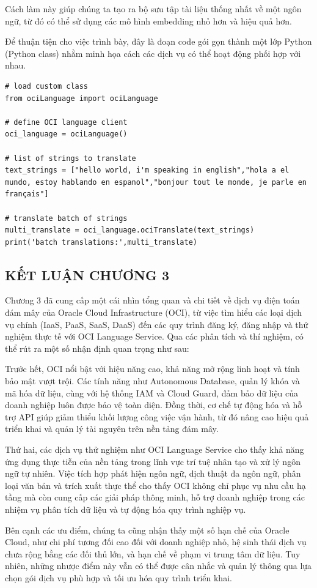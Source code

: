 Cách làm này giúp chúng ta tạo ra bộ sưu tập tài liệu thống nhất về một ngôn ngữ, từ đó có thể sử dụng các mô hình embedding nhỏ hơn và hiệu quả hơn.

Để thuận tiện cho việc trình bày, đây là đoạn code gói gọn thành một lớp Python (Python class) nhằm minh họa cách các dịch vụ có thể hoạt động phối hợp với nhau.

\begin{lstlisting}
# load custom class
from ociLanguage import ociLanguage

# define OCI language client
oci_language = ociLanguage()

# list of strings to translate
text_strings = ["hello world, i'm speaking in english","hola a el mundo, estoy hablando en espanol","bonjour tout le monde, je parle en français"]

# translate batch of strings
multi_translate = oci_language.ociTranslate(text_strings)
print('batch translations:',multi_translate)

\end{lstlisting}

\newpage
\subsection*{\centering KẾT LUẬN CHƯƠNG 3}

Chương 3 đã cung cấp một cái nhìn tổng quan và chi tiết về dịch vụ điện toán đám mây của Oracle Cloud Infrastructure (OCI), từ việc tìm hiểu các loại dịch vụ chính (IaaS, PaaS, SaaS, DaaS) đến các quy trình đăng ký, đăng nhập và thử nghiệm thực tế với OCI Language Service. Qua các phân tích và thí nghiệm, có thể rút ra một số nhận định quan trọng như sau:

Trước hết, OCI nổi bật với hiệu năng cao, khả năng mở rộng linh hoạt và tính bảo mật vượt trội. Các tính năng như Autonomous Database, quản lý khóa và mã hóa dữ liệu, cùng với hệ thống IAM và Cloud Guard, đảm bảo dữ liệu của doanh nghiệp luôn được bảo vệ toàn diện. Đồng thời, cơ chế tự động hóa và hỗ trợ API giúp giảm thiểu khối lượng công việc vận hành, từ đó nâng cao hiệu quả triển khai và quản lý tài nguyên trên nền tảng đám mây.

Thứ hai, các dịch vụ thử nghiệm như OCI Language Service cho thấy khả năng ứng dụng thực tiễn của nền tảng trong lĩnh vực trí tuệ nhân tạo và xử lý ngôn ngữ tự nhiên. Việc tích hợp phát hiện ngôn ngữ, dịch thuật đa ngôn ngữ, phân loại văn bản và trích xuất thực thể cho thấy OCI không chỉ phục vụ nhu cầu hạ tầng mà còn cung cấp các giải pháp thông minh, hỗ trợ doanh nghiệp trong các nhiệm vụ phân tích dữ liệu và tự động hóa quy trình nghiệp vụ.

Bên cạnh các ưu điểm, chúng ta cũng nhận thấy một số hạn chế của Oracle Cloud, như chi phí tương đối cao đối với doanh nghiệp nhỏ, hệ sinh thái dịch vụ chưa rộng bằng các đối thủ lớn, và hạn chế về phạm vi trung tâm dữ liệu. Tuy nhiên, những nhược điểm này vẫn có thể được cân nhắc và quản lý thông qua lựa chọn gói dịch vụ phù hợp và tối ưu hóa quy trình triển khai.
